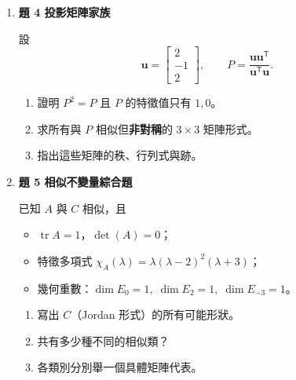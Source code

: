 \documentclass[12pt]{article}
\begin{document}
\begin{enumerate}[label=\arabic*., leftmargin=0pt, itemindent=2em]
\begin{enumerate}[label=\alph*]
  \item 實際算出 $C$。
  \item 檢查 $A$ 與 $C$ 是否相似？若是，寫出對應的相似變換；若否，說明原因。
  \item 比較 $A, C$ 在 \emph{對稱}／\emph{正交} 性質上的差異。
\end{enumerate}

\item \textbf{題 4\; 投影矩陣家族}

設
\[
\mathbf u = \begin{bmatrix}2 \\ -1 \\ 2\end{bmatrix},\qquad
P = \frac{\mathbf u\mathbf u^{\mathsf T}}{\mathbf u^{\mathsf T}\mathbf u}.
\]

\begin{enumerate}[label=\alph*]
  \item 證明 $P^2 = P$ 且 $P$ 的特徵值只有 $1,0$。
  \item 求所有與 $P$ 相似但\textbf{非對稱}的 $3\times3$ 矩陣形式。
  \item 指出這些矩陣的秩、行列式與跡。
\end{enumerate}

\item \textbf{題 5\; \; 相似不變量綜合題}

已知 $A$ 與 $C$ 相似，且
\begin{itemize}
  \item $\operatorname{tr}A = 1$，$\det(A) = 0$；
  \item 特徵多項式 $\chi_{A}{(\lambda)} = \lambda{(\lambda-2)}^{2}(\lambda+3)$；
  \item 幾何重數：$\dim E_{0}=1,\; \dim E_{2}=1,\; \dim E_{-3}=1$。
\end{itemize}

\begin{enumerate}[label=\alph*]
  \item 寫出 $C$（Jordan 形式）的所有可能形狀。
  \item 共有多少種不同的相似類？
  \item 各類別分別舉一個具體矩陣代表。
\end{enumerate}

\end{enumerate}
\end{document}
